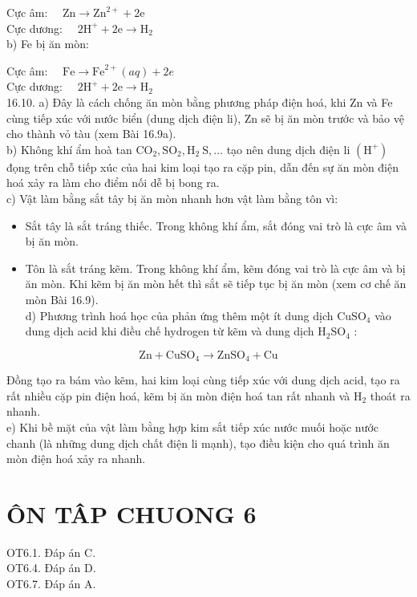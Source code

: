 \documentclass[10pt]{article}
\begin{document}
Cực âm: $\quad \mathrm{Zn} \rightarrow \mathrm{Zn}^{2+}+2 \mathrm{e}$\\
Cực dương: $\quad 2 \mathrm{H}^{+}+2 \mathrm{e} \rightarrow \mathrm{H}_{2}$\\
b) Fe bị ăn mòn:

Cực âm: $\quad \mathrm{Fe} \rightarrow \mathrm{Fe}^{2+}(a q)+2 e$\\
Cực dương: $\quad 2 \mathrm{H}^{+}+2 \mathrm{e} \rightarrow \mathrm{H}_{2}$\\
16.10. a) Đây là cách chống ăn mòn bằng phương pháp điện hoá, khi Zn và Fe cùng tiếp xúc với nước biển (dung dịch điện li), Zn sẽ bị ăn mòn trước và bảo vệ cho thành vỏ tàu (xem Bài 16.9a).\\
b) Không khí ẩm hoà tan $\mathrm{CO}_{2}, \mathrm{SO}_{2}, \mathrm{H}_{2} \mathrm{~S}, \ldots$ tạo nên dung dịch điện li $\left(\mathrm{H}^{+}\right)$đọng trên chỗ tiếp xúc của hai kim loại tạo ra cặp pin, dẫn đến sự ăn mòn điện hoá xảy ra làm cho điểm nối dễ bị bong ra.\\
c) Vật làm bằng sắt tây bị ăn mòn nhanh hơn vật làm bằng tôn vì:

\begin{itemize}
  \item Sắt tây là sắt tráng thiếc. Trong không khí ẩm, sắt đóng vai trò là cực âm và bị ăn mòn.
  \item Tôn là sắt tráng kẽm. Trong không khí ẩm, kẽm đóng vai trò là cực âm và bị ăn mòn. Khi kẽm bị ăn mòn hết thì sắt sẽ tiếp tục bị ăn mòn (xem cơ chế ăn mòn Bài 16.9).\\
d) Phương trình hoá học của phản ứng thêm một ít dung dịch $\mathrm{CuSO}_{4}$ vào dung dịch acid khi điều chế hydrogen từ kẽm và dung dịch $\mathrm{H}_{2} \mathrm{SO}_{4}$ :
\end{itemize}

$$
\mathrm{Zn}+\mathrm{CuSO}_{4} \rightarrow \mathrm{ZnSO}_{4}+\mathrm{Cu}
$$

Đồng tạo ra bám vào kẽm, hai kim loại cùng tiếp xúc với dung dịch acid, tạo ra rất nhiều cặp pin điện hoá, kẽm bị ăn mòn điện hoá tan rất nhanh và $\mathrm{H}_{2}$ thoát ra nhanh.\\
e) Khi bề mặt của vật làm bằng hợp kim sắt tiếp xúc nước muối hoặc nước chanh (là những dung dịch chất điện li mạnh), tạo điều kiện cho quá trình ăn mòn điện hoá xảy ra nhanh.

\section*{ÔN TÂP CHUONG 6}
OT6.1. Đáp án C.\\
OT6.4. Đáp án D.\\
OT6.7. Đáp án A.
\end{document}
